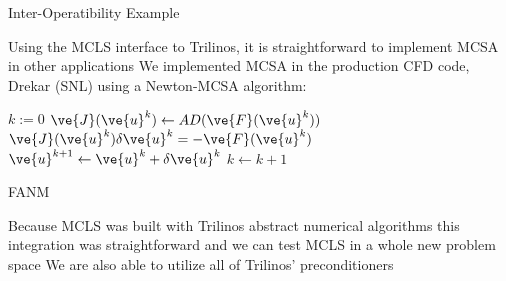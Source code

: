 \documentclass{beamer}
\begin{document}
\begin{frame}{Inter-Operatibility Example}

  Using the MCLS interface to Trilinos, it is straightforward to implement
  MCSA in other applications
  \vfill
  We implemented MCSA in the production CFD code, Drekar (SNL) using a
  Newton-MCSA algorithm:
  \begin{algorithm}[H]
    \footnotesize
    \begin{algorithmic}[1]
      \STATE $k := 0$
      \STATE $\ve{J}(\ve{u}^{k}) \leftarrow AD(\ve{F}(\ve{u}^k))$
      \STATE $\ve{J}(\ve{u}^k) \delta \ve{u}^k = -\ve{F}(\ve{u}^{k})$
      \STATE $\ve{u}^{k+1} \leftarrow \ve{u}^k + \delta \ve{u}^k$
      \STATE $k \leftarrow k+1$
      \ENDWHILE
    \end{algorithmic}
    \caption{FANM}
  \end{algorithm}
  \vfill
  Because MCLS was built with Trilinos abstract numerical algorithms this
  integration was straightforward and we can test MCLS in a whole new problem
  space
  \vfill
  We are also able to utilize all of Trilinos' preconditioners

\end{frame}

\end{document}

